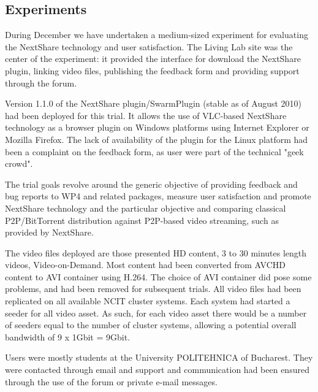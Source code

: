 \subsection{Experiments}
\label{subsec:multimedia-dist:evaluation-december-2010}

During December we have undertaken a
medium-sized experiment for evaluating the NextShare technology and user
satisfaction. The Living Lab site was the center of the experiment: it
provided the interface for download the NextShare plugin, linking video files,
publishing the feedback form and providing support through the forum.

Version 1.1.0 of the NextShare plugin/SwarmPlugin (stable as of August 2010)
had been deployed for this trial. It allows the use of VLC-based NextShare
technology as a browser plugin on Windows platforms using Internet Explorer or
Mozilla Firefox. The lack of availability of the plugin for the Linux platform
had been a complaint on the feedback form, as user were part of the technical
"geek crowd".

The trial goals revolve around the generic objective of providing feedback and
bug reports to WP4 and related packages, measure user satisfaction and promote
NextShare technology and the particular objective and comparing classical
P2P/BitTorrent distribution against P2P-based video streaming, such as
provided by NextShare.

The video files deployed are those presented HD content, 3 to 30 minutes
length videos, Video-on-Demand. Most content had been converted from AVCHD
content to AVI container using H.264. The choice of AVI container did pose
some problems, and had been removed for
subsequent trials. All video files had been replicated on all available NCIT
cluster systems. Each system had started a seeder for all video asset. As
such, for each video asset there would be a number of seeders equal to the
number of cluster systems, allowing a potential overall bandwidth of 9 x 1Gbit
= 9Gbit.

Users were mostly students at the University POLITEHNICA of Bucharest. They
were contacted through email and support and communication had been ensured
through the use of the forum or private e-mail messages.

